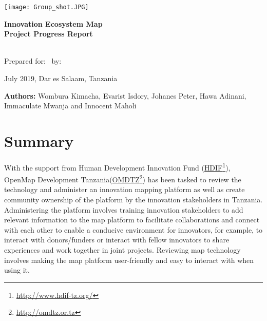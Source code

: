 \documentclass[a4paper,12pt,twoside]{article}
\begin{document}
\thispagestyle{empty}

\begin{center}
\texttt{[image: Group\_shot.JPG]}
\end{center}

\begin{center}
\bigskip
  \Huge 
\color{OMDTZblue} \textbf {Innovation Ecosystem Map}
\\
\textbf{Project Progress Report}
\\
\end{center}
\bigskip \bigskip \bigskip
\\
  \vbox{
  \centering
  Prepared for:
  \
  by:
}
\bigskip  \bigskip \bigskip
\begin{center}
  July 2019, Dar es Salaam, Tanzania  
  
 \bigskip \bigskip \bigskip \bigskip \bigskip \bigskip
\end{center}
 
\begin{flushleft}
	\footnotesize {\textbf{Authors:} Wombura Kimacha, Evarist Isdory, Johanes Peter, Hawa Adinani, Immaculate Mwanja and { } { } { } { } { } { } Innocent Maholi}
\end{flushleft} 
  

\newpage
\tableofcontents

\newpage
\section{Summary}
With the support from Human Development Innovation Fund (\href{http://www.hdif-tz.org/}{HDIF}\footnote{\url{http://www.hdif-tz.org/}}), OpenMap Development Tanzania(\href{http://omdtz.or.tz}{OMDTZ}\footnote{\url{http://omdtz.or.tz}}) has been tasked to review the technology and administer an innovation mapping platform as well as create community ownership of the platform by the innovation stakeholders in Tanzania. Administering the platform involves training innovation stakeholders to add relevant information to the map platform to facilitate collaborations and connect with each other to enable a conducive environment for innovators, for example, to interact with donors/funders or interact with fellow innovators to share experiences and work together in joint projects. Reviewing map technology involves making the map platform user-friendly and easy to interact with when using it.
\end{document}
